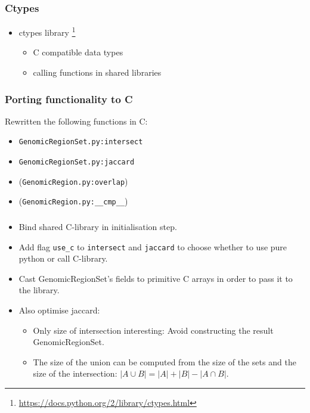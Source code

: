 \begin{frame}%
	\frametitle{Ctypes}
	\begin{itemize}
		\item ctypes library \footnote{\url{https://docs.python.org/2/library/ctypes.html}}
		\begin{itemize}
			\item C compatible data types
			\item calling functions in shared libraries
		\end{itemize}
	\end{itemize}
\end{frame}

\begin{frame}%
	\frametitle{Porting functionality to C}
	Rewritten the following functions in C:
	\begin{itemize}
		\item \texttt{GenomicRegionSet.py:intersect}
		\item \texttt{GenomicRegionSet.py:jaccard}
		\item (\texttt{GenomicRegion.py:overlap})
		\item (\texttt{GenomicRegion.py:\_\_cmp\_\_})
	\end{itemize}
\end{frame}

\begin{frame}%
	\frametitle{}
	\begin{itemize}
		\item Bind shared C-library in initialisation step.
		\item Add flag \texttt{use\_c} to \texttt{intersect} and \texttt{jaccard} to choose whether to use pure python or call C-library.
		\item Cast GenomicRegionSet's fields to primitive C arrays in order to pass it to the library.
		\item Also optimise jaccard:
		\begin{itemize}
			\item Only size of intersection interesting: Avoid constructing the result GenomicRegionSet.
			\item The size of the union can be computed from the size of the sets and the size of the intersection: $|A \cup B| = |A| + |B| - |A \cap B|$.
		\end{itemize}
	
	\end{itemize}
\end{frame}